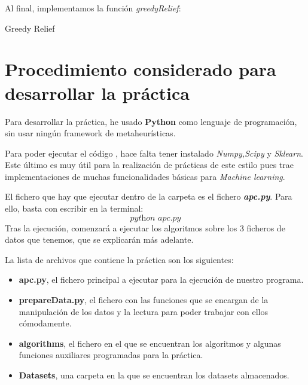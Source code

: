 \documentclass[11pt]{article}
\makeatletter
\def\BState{\State\hskip-\ALG@thistlm}
\makeatother
\begin{document}
Al final, implementamos la función \emph{greedyRelief}: 
\begin{algorithm}
\caption{Greedy Relief}\label{euclid}
\end{algorithm}

\section{Procedimiento considerado para desarrollar la práctica}
Para desarrollar la práctica, he usado \textbf{Python} como lenguaje de programación, sin usar ningún framework de metaheurísticas.

Para poder ejecutar el código , hace falta tener instalado \emph{Numpy,Scipy} y \emph{Sklearn}. Este último es muy útil para la realización de prácticas de este estilo pues trae implementaciones de muchas funcionalidades básicas para \emph{Machine learning}.

El fichero que hay que ejecutar dentro de la carpeta es el fichero \emph{\textbf{apc.py}}. Para ello, basta con escribir en la terminal:
\[
\textit{python apc.py}
\]
Tras la ejecución, comenzará a ejecutar los algoritmos sobre los 3 ficheros de datos que tenemos, que se explicarán más adelante.

La lista de archivos que contiene la práctica son los siguientes:
\begin{itemize}
	\item \textbf{apc.py}, el fichero principal a ejecutar para la ejecución de nuestro programa.
	\item \textbf{prepareData.py}, el fichero con las funciones que se encargan de la manipulación de los datos y la lectura para poder trabajar con ellos cómodamente.
	\item \textbf{algorithms}, el fichero en el que se encuentran los algoritmos y algunas funciones auxiliares programadas para la práctica.
	\item \textbf{Datasets}, una carpeta en la que se encuentran los datasets almacenados.
	
\end{itemize}
\end{document}
